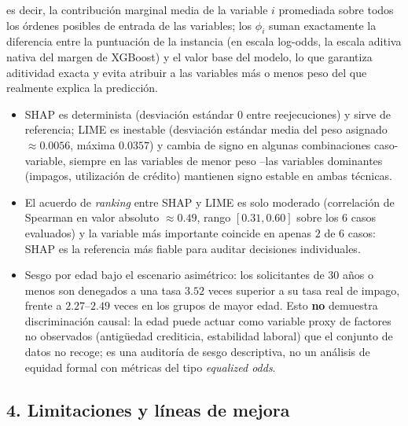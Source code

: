 \documentclass[11pt,a4paper]{article}
\begin{document}
es decir, la contribuci\'on marginal media de la variable $i$ promediada sobre todos los \'ordenes
posibles de entrada de las variables; los $\phi_i$ suman exactamente la diferencia entre la puntuaci\'on
de la instancia (en escala log-odds, la escala aditiva nativa del margen de XGBoost) y el valor base del
modelo, lo que garantiza aditividad exacta y evita atribuir a las variables m\'as o menos peso del que
realmente explica la predicci\'on.

\begin{itemize}
\item SHAP es determinista (desviaci\'on est\'andar $0$ entre reejecuciones) y sirve de referencia; LIME es
inestable (desviaci\'on est\'andar media del peso asignado $\approx 0.0056$, m\'axima $0.0357$) y cambia de
signo en algunas combinaciones caso-variable, siempre en las variables de menor peso --las variables
dominantes (impagos, utilizaci\'on de cr\'edito) mantienen signo estable en ambas t\'ecnicas.
\item El acuerdo de \emph{ranking} entre SHAP y LIME es solo moderado (correlaci\'on de Spearman en valor
absoluto $\approx 0.49$, rango $[0.31, 0.60]$ sobre los $6$ casos evaluados) y la variable m\'as importante
coincide en apenas $2$ de $6$ casos: SHAP es la referencia m\'as fiable para auditar decisiones
individuales.
\item Sesgo por edad bajo el escenario asim\'etrico: los solicitantes de $30$ a\~nos o menos son denegados a
una tasa $3.52$ veces superior a su tasa real de impago, frente a $2.27$--$2.49$ veces en los grupos de
mayor edad. Esto \textbf{no} demuestra discriminaci\'on causal: la edad puede actuar como variable proxy de
factores no observados (antig\"uedad crediticia, estabilidad laboral) que el conjunto de datos no recoge;
es una auditor\'ia de sesgo descriptiva, no un an\'alisis de equidad formal con m\'etricas del tipo
\emph{equalized odds}.
\end{itemize}

\subsection*{4. Limitaciones y l\'ineas de mejora}
\end{document}
